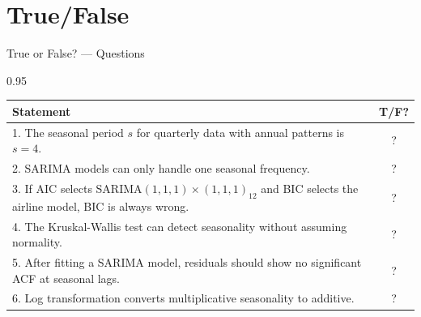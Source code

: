 \documentclass[9pt, aspectratio=169, t]{beamer}
\begin{document}
\section{True/False}

\begin{frame}{True or False? --- Questions}
    \begin{cminipage}{0.95\textwidth}
    \footnotesize
    \begin{center}
    \begin{tabular}{p{9cm}c}
        \toprule
        \textbf{Statement} & \textbf{T/F?} \\
        \midrule
        1. The seasonal period $s$ for quarterly data with annual patterns is $s=4$. & ? \\[0.15cm]
        2. SARIMA models can only handle one seasonal frequency. & ? \\[0.15cm]
        3. If AIC selects SARIMA$(1,1,1) \times (1,1,1)_{12}$ and BIC selects the airline model, BIC is always wrong. & ? \\[0.15cm]
        4. The Kruskal-Wallis test can detect seasonality without assuming normality. & ? \\[0.15cm]
        5. After fitting a SARIMA model, residuals should show no significant ACF at seasonal lags. & ? \\[0.15cm]
        6. Log transformation converts multiplicative seasonality to additive. & ? \\
        \bottomrule
    \end{tabular}
    \end{center}
    \end{cminipage}
\end{frame}
\end{document}
